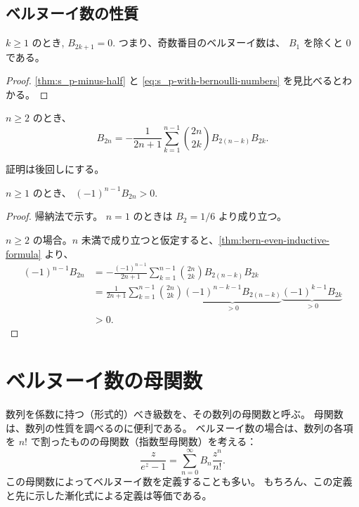 {\subsection{ベルヌーイ数の性質}

\begin{theorem} \label{thm:bern-odd}
  $k\ge 1$ のとき, $B_{2k+1}=0$.
  つまり、奇数番目のベルヌーイ数は、 $B_1$ を除くと $0$ である。
\end{theorem}
\begin{proof}
  \autoref{thm:s_p-minus-half} と \autoref{eq:s_p-with-bernoulli-numbers} を見比べるとわかる。
\end{proof}


\begin{theorem} \label{thm:bern-even-inductive-formula}
  $n\ge 2$ のとき、
  \[
    B_{2n}=-\frac{1}{2n+1}\sum_{k=1}^{n-1}\binom{2n}{2k}B_{2(n-k)}B_{2k}.
  \]
\end{theorem}
証明は後回しにする。

\begin{corollary}
  $n\ge 1$ のとき、 $(-1)^{n-1}B_{2n}>0$.
\end{corollary}
\begin{proof}
  帰納法で示す。
  $n=1$ のときは $B_2=1/6$ より成り立つ。

  $n\ge 2$ の場合。$n$ 未満で成り立つと仮定すると、\autoref{thm:bern-even-inductive-formula} より、
  \begin{align*}
    (-1)^{n-1} B_{2n}
    &=-\frac{(-1)^{n-1}}{2n+1}\sum_{k=1}^{n-1}\binom{2n}{2k}B_{2(n-k)}B_{2k} \\
    &=\frac{1}{2n+1}\sum_{k=1}^{n-1}\binom{2n}{2k}
      \underbrace{(-1)^{n-k-1}B_{2(n-k)}}_{>0}
      \underbrace{(-1)^{k-1}B_{2k}}_{>0} \\
    &>0.
  \end{align*}
\end{proof}

\section{ベルヌーイ数の母関数}
数列を係数に持つ（形式的）べき級数を、その数列の母関数と呼ぶ。
母関数は、数列の性質を調べるのに便利である。
ベルヌーイ数の場合は、数列の各項を $n!$ で割ったものの母関数（指数型母関数）を考える：
\begin{equation} \label{eq:exponential-generating-function}
  \frac{z}{e^z-1}=\sum_{n=0}^\infty B_n\frac{z^n}{n!}.
\end{equation}
この母関数によってベルヌーイ数を定義することも多い。
もちろん、この定義と先に示した漸化式による定義は等価である。

}
